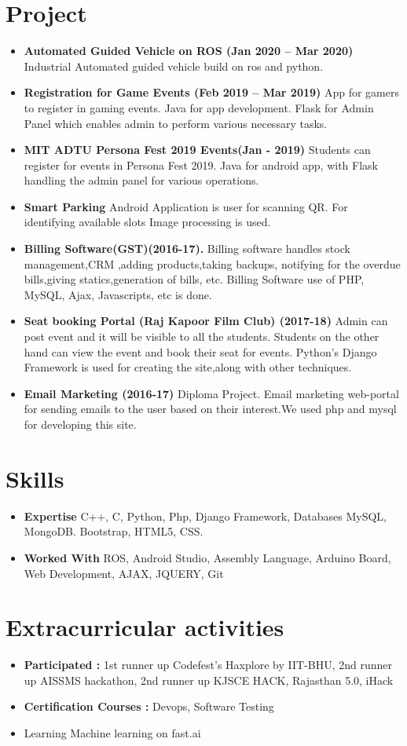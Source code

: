 \documentclass[letterpaper,11pt]{article}
\newcommand{\resumeItem}[2]{
  \item\small{
    \textbf{#1}{ #2 \vspace{-2pt}}
  }
}
\newcommand{\resumeSubItem}[2]{\resumeItem{#1}{#2}\vspace{-4pt}}
\newcommand{\resumeSubHeadingListStart}{\begin{itemize}[leftmargin=*]}
\newcommand{\resumeSubHeadingListEnd}{\end{itemize}}
\newcommand{\resumeItemListEnd}{\end{itemize}\vspace{-5pt}}
\begin{document}
\section{Project}
  \resumeSubHeadingListStart
        \resumeItem{Automated Guided Vehicle on ROS (Jan 2020 – Mar 2020)}
            {Industrial Automated guided vehicle build on ros and python.}
        \resumeItem{Registration for Game Events (Feb 2019 – Mar 2019)}
          {App for gamers to register in gaming events. Java for app development. Flask for Admin Panel which enables admin to perform various necessary tasks.}
        \resumeItem{MIT ADTU Persona Fest 2019 Events(Jan - 2019)}
          {Students can register for events in Persona Fest 2019. Java for android app, with Flask handling the admin panel for various operations.}
          \resumeItem{Smart Parking}
          {Android Application is user for scanning QR. For identifying available slots Image processing is used.}
          \resumeItem{Billing Software(GST)(2016-17).}
          {Billing software handles stock management,CRM ,adding products,taking backups, notifying for the overdue bills,giving statics,generation of bills, etc. Billing Software use of PHP, MySQL, Ajax, Javascripts, etc is done.}
        \resumeItem{Seat booking Portal (Raj Kapoor Film Club) (2017-18)}
          {Admin can post event and it will be visible to all the students. Students on the other hand can view the event and book their seat for events. Python's Django Framework is used for creating the site,along with other techniques.}
         \resumeItem{Email Marketing (2016-17)}
          {Diploma Project. Email marketing web-portal for sending emails to the user based on their interest.We used php and mysql for developing this site.}
          
      \resumeItemListEnd



\section{Skills}
  \resumeSubHeadingListStart
    \resumeSubItem{Expertise}
      {C++, C, Python, Php, Django Framework, Databases MySQL, MongoDB. Bootstrap, HTML5, CSS.}
    \resumeSubItem{Worked With}
      {ROS, Android Studio, Assembly Language, Arduino Board, Web Development, AJAX, JQUERY, Git}
  \resumeSubHeadingListEnd
  
\section{Extracurricular activities}
  \resumeSubHeadingListStart
    \resumeSubItem{Participated :}{1st runner up Codefest's Haxplore by IIT-BHU, 2nd runner up AISSMS hackathon, 2nd runner up KJSCE HACK, Rajasthan 5.0, iHack}
    \resumeSubItem{Certification Courses :}{Devops, Software Testing}
    \resumeSubItem{}{Learning Machine learning on fast.ai}
  \resumeSubHeadingListEnd
  
\end{document}
